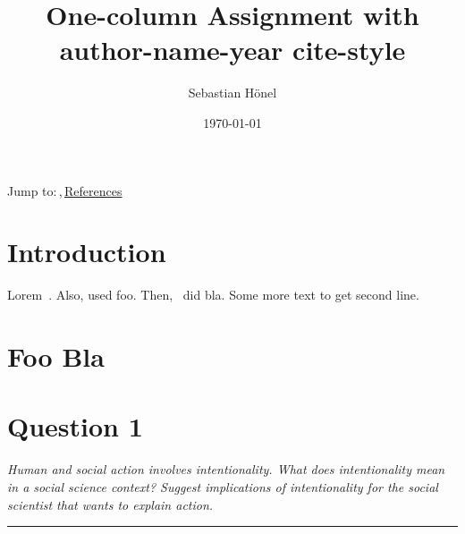 \documentclass[10pt,a4paper,egregdoesnotlikesansseriftitles]{scrartcl}
\title{One-column Assignment with author-name-year cite-style}
\author{Sebastian Hönel}
\date{\today}
\begin{document}
\maketitle

\noindent Jump to:\;\;\leftpointright\,\hyperref[sec:q1]{},\;\;\leftpointright\,\hyperref[sec:refs]{References}

\section*{Introduction}
%
%
Lorem~\citep{kellogg2006life}. Also, \citeauthor{deriso2019general} used foo. Then,~ did bla. Some more text to get second line.

\lipsum[1]


\section*{Foo Bla}
\lipsum[1-3]



\section*{Question 1}\label{sec:q1}
\small
\textit{Human and social action involves intentionality. What does intentionality mean in a social science context? Suggest implications of intentionality for the social scientist that wants to explain action.}

\noindent\rule{\textwidth}{.8pt}

\normalsize
\setstretch{\DEFAULTSTRETCH}

\vspace{1em}\noindent\lipsum[1]



\printbibliography[heading=subbibintoc]\label{sec:refs}
\end{document}
